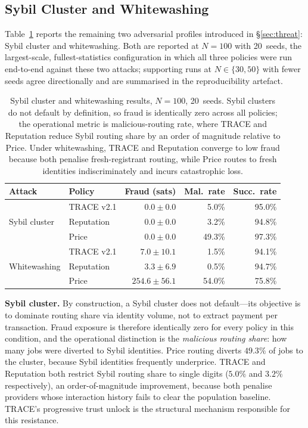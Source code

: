 \documentclass[sigconf,nonacm,10pt]{acmart}
\begin{document}
\subsection{Sybil Cluster and Whitewashing}
\label{sec:eval:other}

Table~\ref{tab:other_attacks} reports the remaining two
adversarial profiles introduced in \S\ref{sec:threat}: Sybil
cluster and whitewashing. Both are reported at $N{=}100$ with
20~seeds, the largest-scale, fullest-statistics configuration in
which all three policies were run end-to-end against these two
attacks; supporting runs at $N \in \{30, 50\}$ with fewer seeds
agree directionally and are summarised in the reproducibility
artefact.

\begin{table}[t]
  \centering
  \caption{Sybil cluster and whitewashing results, $N{=}100$,
    20~seeds. Sybil clusters do not default by definition, so
    fraud is identically zero across all policies; the
    operational metric is malicious-routing rate, where TRACE and
    Reputation reduce Sybil routing share by an order of
    magnitude relative to Price. Under whitewashing, TRACE and
    Reputation converge to low fraud because both penalise
    fresh-registrant routing, while Price routes to fresh
    identities indiscriminately and incurs catastrophic loss.}
  \label{tab:other_attacks}
  \footnotesize
  \setlength{\tabcolsep}{4pt}
  \begin{tabular}{llrrr}
    \toprule
    Attack & Policy & Fraud (sats) & Mal.\ rate & Succ.\ rate \\
    \midrule
    \multirow{3}{*}{Sybil cluster}
      & TRACE v2.1  & $0.0 \pm 0.0$    & 5.0\%  & 95.0\% \\
      & Reputation  & $0.0 \pm 0.0$    & 3.2\%  & 94.8\% \\
      & Price       & $0.0 \pm 0.0$    & 49.3\% & 97.3\% \\
    \midrule
    \multirow{3}{*}{Whitewashing}
      & TRACE v2.1  & $7.0 \pm 10.1$   & 1.5\%  & 94.1\% \\
      & Reputation  & $3.3 \pm 6.9$    & 0.5\%  & 94.7\% \\
      & Price       & $254.6 \pm 56.1$ & 54.0\% & 75.8\% \\
    \bottomrule
  \end{tabular}
\end{table}

\noindent\textbf{Sybil cluster.}
By construction, a Sybil cluster does not default---its objective
is to dominate routing share via identity volume, not to extract
payment per transaction. Fraud exposure is therefore identically
zero for every policy in this condition, and the operational
distinction is the \emph{malicious routing share}: how many jobs
were diverted to Sybil identities. Price routing diverts $49.3\%$
of jobs to the cluster, because Sybil identities frequently
underprice. TRACE and Reputation both restrict Sybil routing
share to single digits ($5.0\%$ and $3.2\%$ respectively), an
order-of-magnitude improvement, because both penalise providers
whose interaction history fails to clear the population baseline.
TRACE's progressive trust unlock is the structural mechanism
responsible for this resistance.
\end{document}
